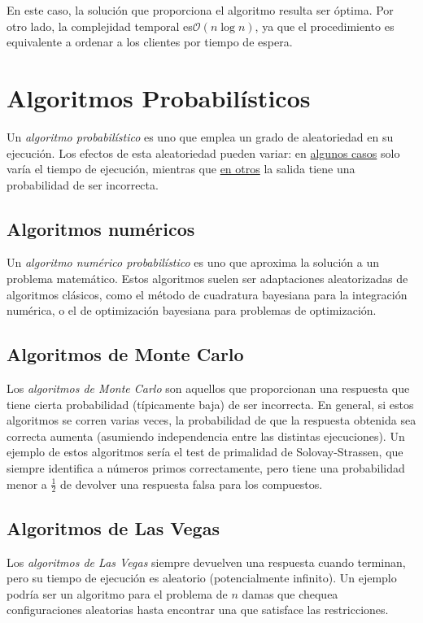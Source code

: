\documentclass[a4paper]{report}
\newcommand{\BigO}[1]{\ensuremath{\mathcal{O}(#1)}}
\begin{document}
En este caso, la solución que proporciona el algoritmo resulta ser óptima. Por otro lado, la complejidad temporal es\BigO{n\log{n}}, ya que el procedimiento es equivalente a ordenar a los clientes por tiempo de espera.

\section{Algoritmos Probabilísticos}

Un \textit{algoritmo probabilístico} es uno que emplea un grado de aleatoriedad en su ejecución. Los efectos de esta aleatoriedad pueden variar: en \hyperref[las-vegas]{algunos casos} solo varía el tiempo de ejecución, mientras que \hyperref[monte-carlo]{en otros} la salida tiene una probabilidad de ser incorrecta.

\subsection{Algoritmos numéricos}

Un \textit{algoritmo numérico probabilístico} es uno que aproxima la solución a un problema matemático. Estos algoritmos suelen ser adaptaciones aleatorizadas de algoritmos clásicos, como el método de cuadratura bayesiana para la integración numérica, o el de optimización bayesiana para problemas de optimización.

\subsection{Algoritmos de Monte Carlo}
\label{monte-carlo}

Los \textit{algoritmos de Monte Carlo} son aquellos que proporcionan una respuesta que tiene cierta probabilidad (típicamente baja) de ser incorrecta. En general, si estos algoritmos se corren varias veces, la probabilidad de que la respuesta obtenida sea correcta aumenta (asumiendo independencia entre las distintas ejecuciones). Un ejemplo de estos algoritmos sería el test de primalidad de Solovay-Strassen, que siempre identifica a números primos correctamente, pero tiene una probabilidad menor a $\frac{1}{2}$ de devolver una respuesta falsa para los compuestos.

\subsection{Algoritmos de Las Vegas}
\label{las-vegas}

Los \textit{algoritmos de Las Vegas} siempre devuelven una respuesta cuando terminan, pero su tiempo de ejecución es aleatorio (potencialmente infinito). Un ejemplo podría ser un algoritmo para el problema de $n$ damas que chequea configuraciones aleatorias hasta encontrar una que satisface las restricciones.
\end{document}
